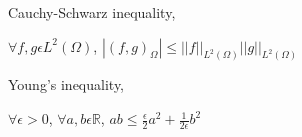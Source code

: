 \documentclass[a4paper,12pt]{book}
\begin{document}
Cauchy-Schwarz inequality,\\
\begin{center}
$\forall f,g \epsilon L^2(\Omega)$, $|(f,g)_{\Omega}| \leq ||f||_{L^2(\Omega)} ||g||_{L^2(\Omega)}$ \\
\end{center}

Young's inequality,\\
\begin{center}
$\forall \epsilon > 0$, $\forall a,b \epsilon \mathbb{R}$, $ab \leq \frac{\epsilon}{2}a^2 + \frac{1}{2 \epsilon}b^2$\\
\end{center}



\end{document}
